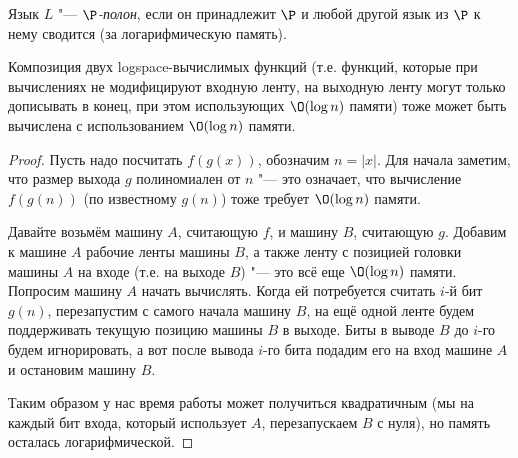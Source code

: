 	\begin{Def}
		Язык $L$ "--- \textit{$\P$-полон}, если он принадлежит $\P$ и любой другой язык из $\P$
		к нему сводится (за логарифмическую память).
	\end{Def}

	\begin{lemma}
		Композиция двух logspace-вычислимых функций (т.е. функций, которые при вычислениях не модифицируют входную ленту, на выходную ленту могут только дописывать в конец, при этом
		использующих $\O(\log n)$ памяти) тоже может быть вычислена с использованием $\O(\log n)$ памяти.
	\end{lemma}
	\begin{proof}
		Пусть надо посчитать $f(g(x))$, обозначим $n=|x|$.
		Для начала заметим, что размер выхода $g$ полиномиален от $n$ "--- это означает, что вычисление $f(g(n))$
		(по известному $g(n)$) тоже требует $\O(\log n)$ памяти.

		Давайте возьмём машину $A$, считающую $f$, и машину $B$, считающую $g$.
		Добавим к машине $A$ рабочие ленты машины $B$, а также ленту с позицией головки машины $A$ на входе (т.е. на выходе $B$) "--- это всё еще $\O(\log n)$ памяти.
		Попросим машину $A$ начать вычислять.
		Когда ей потребуется считать $i$-й бит $g(n)$, перезапустим с самого начала машину $B$, на ещё одной ленте будем поддерживать
		текущую позицию машины $B$ в выходе.
		Биты в выводе $B$ до $i$-го будем игнорировать, а вот после вывода $i$-го бита подадим его на вход машине $A$ и остановим машину $B$.

		Таким образом у нас время работы может получиться квадратичным (мы на каждый бит входа, который использует $A$, перезапускаем $B$ с нуля),
		но память осталась логарифмической.
	\end{proof}

